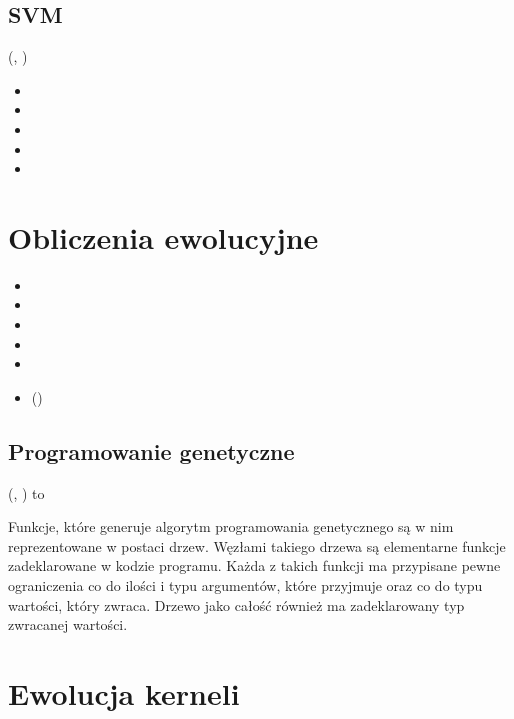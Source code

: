 \subsection{SVM}
    
 (, )

\begin{itemize}
\item {}
\item {}
\item {}
\item {}
\item {}
\end{itemize}

\section{Obliczenia ewolucyjne}

\begin{itemize}
\item {}
\item {}
\item {}
\item {}
\item {}
\item {} ()
\end{itemize}

\subsection{Programowanie genetyczne}
 (, ) to 

Funkcje, które generuje algorytm programowania genetycznego są w nim reprezentowane w postaci drzew. Węzłami takiego drzewa są elementarne funkcje zadeklarowane w kodzie programu. Każda z takich funkcji ma przypisane pewne ograniczenia co do ilości i typu argumentów, które przyjmuje oraz co do typu wartości, który zwraca. Drzewo jako całość również ma zadeklarowany typ zwracanej wartości.

\section{Ewolucja kerneli}

\clearpage